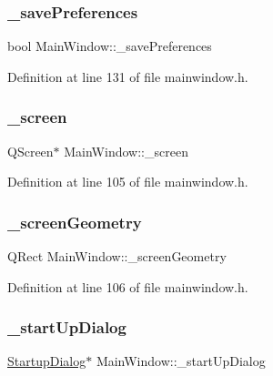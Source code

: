 \subsubsection{\texorpdfstring{\_savePreferences}{\_savePreferences}}
{\footnotesize\ttfamily bool Main\+Window\+::\+\_\+save\+Preferences\hspace{0.3cm}{\ttfamily [private]}}



Definition at line 131 of file mainwindow.\+h.

\mbox{\label{class_main_window_aaca1bb52c5de2823d0d2ebda6a074fed}} 
\subsubsection{\texorpdfstring{\_screen}{\_screen}}
{\footnotesize\ttfamily Q\+Screen$\ast$ Main\+Window\+::\+\_\+screen\hspace{0.3cm}{\ttfamily [private]}}



Definition at line 105 of file mainwindow.\+h.

\mbox{\label{class_main_window_a87aaa571db28f88942b781c44eac7ba5}} 
\subsubsection{\texorpdfstring{\_screenGeometry}{\_screenGeometry}}
{\footnotesize\ttfamily Q\+Rect Main\+Window\+::\+\_\+screen\+Geometry\hspace{0.3cm}{\ttfamily [private]}}



Definition at line 106 of file mainwindow.\+h.

\mbox{\label{class_main_window_a850dd2c4a3175dffc1ca0aff45f90df2}} 
\subsubsection{\texorpdfstring{\_startUpDialog}{\_startUpDialog}}
{\footnotesize\ttfamily \mbox{\hyperlink{class_startup_dialog}{Startup\+Dialog}}$\ast$ Main\+Window\+::\+\_\+start\+Up\+Dialog\hspace{0.3cm}{\ttfamily [private]}}




